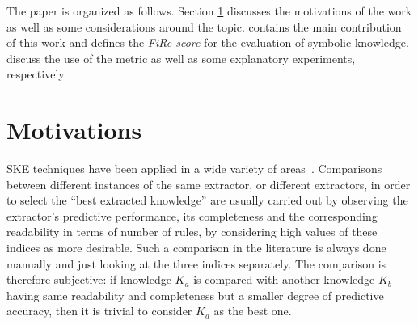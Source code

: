\documentclass{article}
\newcommand{\fire}{FiRe}
\begin{document}
The paper is organized as follows.
Section \ref{sec:motivation} discusses the motivations of the work as well as some considerations around the topic.
%
 contains the main contribution of this work and defines the \emph{\fire{} score} for the evaluation of symbolic knowledge.
 discuss the use of the metric as well as some explanatory experiments, respectively.

\section{Motivations}\label{sec:motivation}

SKE techniques have been applied in a wide variety of areas~\cite[to cite some examples]{bologna1997three,hayashi2000comparison,baesens2003using,hofmann2003rule,steiner2006using,franco2007early,sabbatini22LPFSKE}.
%
Comparisons between different instances of the same extractor, or different extractors, in order to select the ``best extracted knowledge'' are usually carried out by observing the extractor's predictive performance, its completeness and the corresponding readability in terms of number of rules, by considering high values of these indices as more desirable.
%
Such a comparison in the literature is always done manually and just looking at the three indices separately.
%
The comparison is therefore subjective: if knowledge $K_a$ is compared with another knowledge $K_b$ having same readability and completeness but a smaller degree of predictive accuracy, then it is trivial to consider $K_a$ as the best one.
\end{document}
